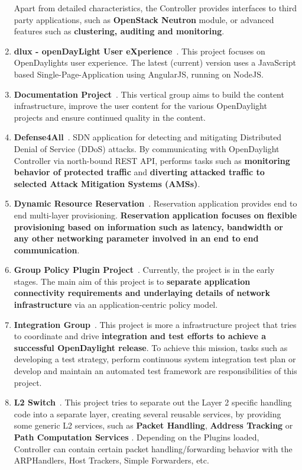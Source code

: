 \documentclass[a4paper, 12pt]{book}
\begin{document}
\begin{enumerate}
Apart from detailed characteristics, the Controller provides interfaces to third party applications, such as \textbf{OpenStack Neutron} module, or advanced features such as \textbf{clustering, auditing and monitoring}.
\item{\textbf{dlux - openDayLight User eXperience}}~\cite{OpenDaylightWikiDlux}. This project focuses on OpenDaylights user experience. The latest (current) version uses a JavaScript based Single-Page-Application using AngularJS, running on NodeJS.
\item{\textbf{Documentation Project}}~\cite{OpenDaylightWikiDoc}. This vertical group aims to build the content infrastructure, improve the user content for the various OpenDaylight projects and ensure continued quality in the content.
\item{\textbf{Defense4All}}~\cite{OpenDaylightWikiDefense4All}. SDN application for detecting and mitigating Distributed Denial of Service (DDoS) attacks. By communicating with OpenDaylight Controller via north-bound REST API, performs tasks such as \textbf{monitoring behavior of protected traffic} and \textbf{diverting attacked traffic to selected Attack Mitigation Systems (AMSs)}.
\item{\textbf{Dynamic Resource Reservation}}~\cite{OpenDaylightWikiReservation}. Reservation application provides end to end multi-layer provisioning. \textbf{Reservation application focuses on flexible provisioning based on information such as latency, bandwidth or any other networking parameter involved in an end to end communication}.
\item{\textbf{Group Policy Plugin Project}}~\cite{OpenDaylightWikiGroupPolicy}. Currently, the project is in the early stages. The main aim of this project is to \textbf{separate application connectivity requirements and underlaying details of network infrastructure} via an application-centric policy model.
\item{\textbf{Integration Group}}~\cite{OpenDaylightWikiIntegration}. This project is more a infrastructure project that tries to coordinate and drive \textbf{integration and test efforts to achieve a successful OpenDaylight release}. To achieve this mission, tasks such as developing a test strategy, perform continuous system integration test plan or develop and maintain an automated test framework are responsibilities of this project.
\item{\textbf{L2 Switch}}~\cite{OpenDaylightWikiL2Switch}. This project tries to separate out the Layer 2 specific handling code into a separate layer, creating several reusable services, by providing some generic L2 services, such as \textbf{Packet Handling}, \textbf{Address Tracking} or \textbf{Path Computation Services} . Depending on the Plugins loaded, Controller can contain certain packet handling/forwarding behavior with the ARPHandlers, Host Trackers, Simple Forwarders, etc.

\end{enumerate}
\end{document}
